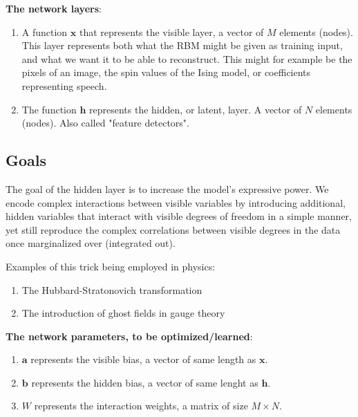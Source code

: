 \documentclass[%
oneside,                 %
final,                   %
10pt]{article}
\begin{document}
\textbf{The network layers}:
\begin{enumerate}
 \item A function $\mathbf{x}$ that represents the visible layer, a vector of $M$ elements (nodes). This layer represents both what the RBM might be given as training input, and what we want it to be able to reconstruct. This might for example be the pixels of an image, the spin values of the Ising model, or coefficients representing speech.

 \item The function $\mathbf{h}$ represents the hidden, or latent, layer. A vector of $N$ elements (nodes). Also called "feature detectors".
\end{enumerate}

\noindent
\subsection{Goals}

The goal of the hidden layer is to increase the model's expressive power. We encode complex interactions between visible variables by introducing additional, hidden variables that interact with visible degrees of freedom in a simple manner, yet still reproduce the complex correlations between visible degrees in the data once marginalized over (integrated out).

Examples of this trick being employed in physics: 
\begin{enumerate}
 \item The Hubbard-Stratonovich transformation

 \item The introduction of ghost fields in gauge theory
\end{enumerate}

\noindent
\textbf{The network parameters, to be optimized/learned}:
\begin{enumerate}
 \item $\mathbf{a}$ represents the visible bias, a vector of same length as $\mathbf{x}$.

 \item $\mathbf{b}$ represents the hidden bias, a vector of same lenght as $\mathbf{h}$.

 \item $W$ represents the interaction weights, a matrix of size $M\times N$.
\end{enumerate}

\noindent
\end{document}
